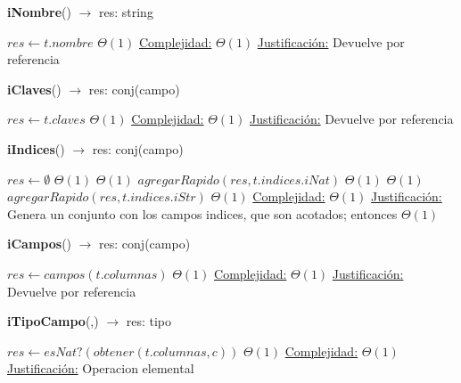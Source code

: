 \begin{algorithm}[H]{\textbf{iNombre}() $\to$ res: string}
	\begin{algorithmic}[1]
		\State $res \gets t.nombre$	\Comment $\Theta(1)$
		\medskip
		\Statex \underline{Complejidad:} $\Theta(1)$
		\Statex \underline{Justificación:} Devuelve por referencia
	\end{algorithmic}
\end{algorithm}

\begin{algorithm}[H]{\textbf{iClaves}() $\to$ res: conj(campo)}
	\begin{algorithmic}[1]
		\State $res \gets t.claves$	\Comment $\Theta(1)$
		\medskip
		\Statex \underline{Complejidad:} $\Theta(1)$
		\Statex \underline{Justificación:} Devuelve por referencia
	\end{algorithmic}
\end{algorithm}

\begin{algorithm}[H]{\textbf{iIndices}() $\to$ res: conj(campo)}
	\begin{algorithmic}[1]
		\State $res \gets \emptyset$ \Comment $\Theta(1)$
			\Comment $\Theta(1)$
			\State $agregarRapido(res,t.indices.iNat)$ \Comment $\Theta(1)$
		\EndIf 
			\Comment $\Theta(1)$
			\State $agregarRapido(res,t.indices.iStr)$ \Comment $\Theta(1)$
		\EndIf 
		\medskip
		\Statex \underline{Complejidad:} $\Theta(1)$
		\Statex \underline{Justificación:} Genera un conjunto con los campos indices, que son acotados; entonces $\Theta(1)$ 
	\end{algorithmic}
\end{algorithm}

\begin{algorithm}[H]{\textbf{iCampos}() $\to$ res: conj(campo)}
	\begin{algorithmic}[1]
		\State $res \gets campos(t.columnas)$	\Comment $\Theta(1)$
		\medskip
		\Statex \underline{Complejidad:} $\Theta(1)$
		\Statex \underline{Justificación:} Devuelve por referencia
	\end{algorithmic}
\end{algorithm}

\begin{algorithm}[H]{\textbf{iTipoCampo}(,) $\to$ res: tipo}
	\begin{algorithmic}[1]
		\State $res \gets esNat?(obtener(t.columnas,c))$	\Comment $\Theta(1)$
		\medskip
		\Statex \underline{Complejidad:} $\Theta(1)$
		\Statex \underline{Justificación:} Operacion elemental
	\end{algorithmic}
\end{algorithm}

